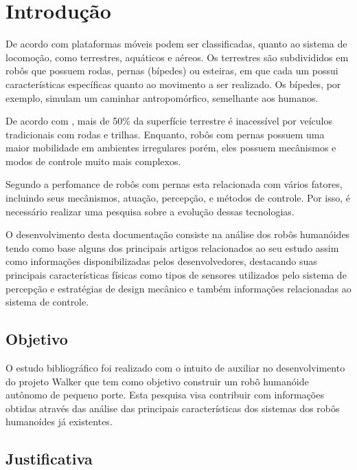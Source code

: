 \chapter{Introdução}
\label{chap:intro}

De acordo com  plataformas móveis podem ser classificadas, quanto ao sistema de locomoção, como terrestres, aquáticos e aéreos. Os terrestres são subdivididos em robôs que possuem rodas, pernas (bípedes) ou esteiras, em que cada um  possui características específicas quanto ao movimento a ser realizado. Os bípedes, por exemplo, simulam um caminhar antropomórfico, semelhante aos humanos. 

De acordo com , mais de 50\% da superfície terrestre é inacessível por veículos tradicionais com rodas e trilhas. Enquanto, robôs com pernas possuem uma maior mobilidade em ambientes irregulares porém, eles possuem mecânismos e modos de controle muito mais complexos.\cite{Wieber20161203}

Segundo  a perfomance de robôs com pernas esta relacionada com vários fatores, incluindo seus mecânismos, atuação, percepção, e métodos de controle. Por isso, é necessário realizar uma pesquisa sobre a evolução dessas tecnologias.

O desenvolvimento desta documentação consiste na análise dos robôs humanóides tendo como base alguns dos principais artigos relacionados ao seu estudo assim como informações disponibilizadas pelos desenvolvedores, destacando suas principais características físicas como tipos de sensores utilizados pelo sistema de percepção e estratégias de design mecânico e também informações relacionadas ao sistema de controle.

\section{Objetivo}
\label{sec:obj}

O estudo bibliográfico foi realizado com o intuito de auxiliar no desenvolvimento do projeto Walker que tem como objetivo construir um robô humanóide autônomo de pequeno porte. Esta pesquisa visa contribuir com informações obtidas através das análise das principais características dos sistemas dos robôs humanoídes já existentes. 

\section{Justificativa}
\label{sec:justi}

